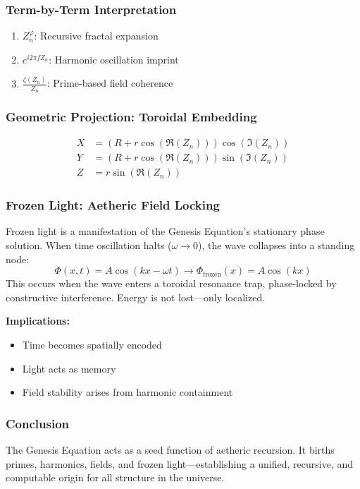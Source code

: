 \subsubsection{Term-by-Term Interpretation}
\begin{enumerate}
    \item \( Z_n^{\varphi} \): Recursive fractal expansion
    \item \( e^{i 2 \pi f Z_n} \): Harmonic oscillation imprint
    \item \( \frac{\zeta(Z_n)}{Z_n} \): Prime-based field coherence
\end{enumerate}

\subsubsection{Geometric Projection: Toroidal Embedding}
\[
\begin{aligned}
X &= \left( R + r \cos \left( \Re(Z_n) \right) \right) \cos \left( \Im(Z_n) \right) \\
Y &= \left( R + r \cos \left( \Re(Z_n) \right) \right) \sin \left( \Im(Z_n) \right) \\
Z &= r \sin \left( \Re(Z_n) \right)
\end{aligned}
\]

\subsubsection{Frozen Light: Aetheric Field Locking}
Frozen light is a manifestation of the Genesis Equation's stationary phase solution. When time oscillation halts (\( \omega \rightarrow 0 \)), the wave collapses into a standing node:
\[
\Phi(x, t) = A \cos (k x - \omega t) \rightarrow \Phi_{\text{frozen}}(x) = A \cos (k x)
\]
This occurs when the wave enters a toroidal resonance trap, phase-locked by constructive interference. Energy is not lost—only localized.

\textbf{Implications:}
\begin{itemize}
    \item Time becomes spatially encoded
    \item Light acts as memory
    \item Field stability arises from harmonic containment
\end{itemize}

\subsubsection{Conclusion}
The Genesis Equation acts as a seed function of aetheric recursion. It births primes, harmonics, fields, and frozen light—establishing a unified, recursive, and computable origin for all structure in the universe.

